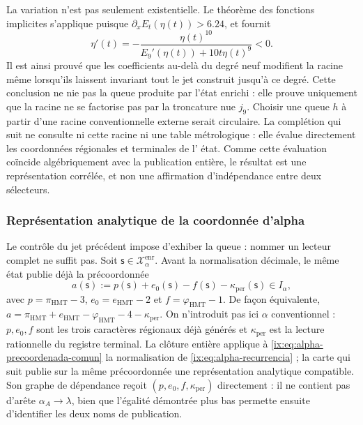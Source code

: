 La variation n'est pas seulement existentielle. Le théorème des fonctions implicites s'applique puisque \(\partial_xE_t(\eta(t))>6.24\), et fournit
\begin{equation}
 \eta'(t)=-
 \frac{\eta(t)^{10}}
 {E_9'(\eta(t))+10t\eta(t)^9}<0.
 \label{ix:eq:alpha-variacion-raiz-prolongacion}
\end{equation}
Il est ainsi prouvé que les coefficients au-delà du degré neuf modifient
la racine même lorsqu'ils laissent invariant tout le jet construit jusqu'à ce degré.
Cette conclusion ne nie pas la queue produite par l'état enrichi : elle prouve
uniquement que la racine ne se factorise pas par la troncature nue
\(j_9\). Choisir une queue \(h\) à partir d'une racine conventionnelle externe
serait circulaire. La complétion qui suit ne consulte ni cette racine ni une table
métrologique : elle évalue directement les coordonnées régionales et terminales de l'
état. Comme cette évaluation coïncide algébriquement avec la publication
entière, le résultat est une représentation corrélée, et non une affirmation
d'indépendance entre deux sélecteurs.


\subsubsection{Représentation analytique de la coordonnée d'alpha}
\label{ix:subsec:alpha-lector-completo-rev08}

Le contrôle du jet précédent impose d'exhiber la queue : nommer un
lecteur complet ne suffit pas. Soit \(\mathsf s\in\mathcal X_\alpha^{\mathrm{enr}}\). Avant
la normalisation décimale, le même état publie déjà la précoordonnée
\begin{equation}
 a(\mathsf s):=p(\mathsf s)+e_0(\mathsf s)-f(\mathsf s)
                 -\kappa_{\mathrm{per}}(\mathsf s)\in I_\alpha,
 \label{ix:eq:alpha-precoordenada-comun}
\end{equation}
avec \(p=\pi_{\mathrm{HMT}}-3\),
\(e_0=e_{\mathrm{HMT}}-2\) et
\(f=\varphi_{\mathrm{HMT}}-1\). De façon équivalente,
\(a=\pi_{\mathrm{HMT}}+e_{\mathrm{HMT}}-
\varphi_{\mathrm{HMT}}-4-\kappa_{\mathrm{per}}\). On n'introduit pas ici
\(\alpha\) conventionnel : \(p,e_0,f\) sont les trois caractères régionaux déjà
générés et \(\kappa_{\mathrm{per}}\) est la lecture rationnelle du registre
terminal. La clôture entière applique à
\eqref{ix:eq:alpha-precoordenada-comun} la normalisation de
\eqref{ix:eq:alpha-recurrencia} ; la carte qui suit publie sur la même
précoordonnée une représentation analytique compatible. Son graphe de
dépendance reçoit \((p,e_0,f,\kappa_{\mathrm{per}})\) directement : il ne
contient pas d'arête \(\alpha_A\to\lambda\), bien que l'égalité démontrée plus
bas permette ensuite d'identifier les deux noms de publication.

